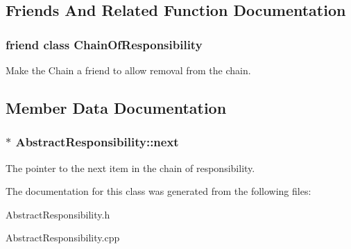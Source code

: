 \subsection{Friends And Related Function Documentation}
\hypertarget{classAbstractResponsibility_a481df313240bacf48790db6d338f51d0}{
\subsubsection[{Chain\-Of\-Responsibility}]{\setlength{\rightskip}{0pt plus 5cm}friend class {\bf Chain\-Of\-Responsibility}\hspace{0.3cm}{\ttfamily [friend]}}}\label{classAbstractResponsibility_a481df313240bacf48790db6d338f51d0}
Make the Chain a friend to allow removal from the chain. 

\subsection{Member Data Documentation}
\hypertarget{classAbstractResponsibility_a2af04f271483fd99267d5f6205ec257f}{
\subsubsection[{next}]{$\ast$ Abstract\-Responsibility\-::next\hspace{0.3cm}{\ttfamily [protected]}}}\label{classAbstractResponsibility_a2af04f271483fd99267d5f6205ec257f}
The pointer to the next item in the chain of responsibility. 

The documentation for this class was generated from the following files\-:\begin{DoxyCompactItemize}
\item 
Abstract\-Responsibility.\-h\item 
Abstract\-Responsibility.\-cpp\end{DoxyCompactItemize}

